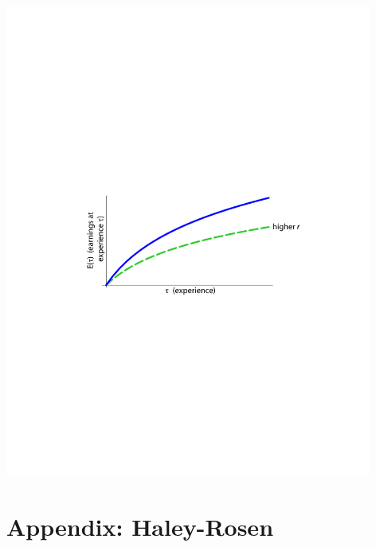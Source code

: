 \documentclass[12pt,compress,handout]{beamer}  %
\begin{document}
\begin{frame}

\begin{center}
\includegraphics[width=4.75in]{include/fig-earnings-growth}
\end{center}

\end{frame}


\section[Appendix]{Appendix: Haley-Rosen}
\end{document}
